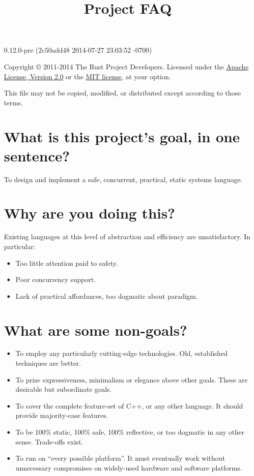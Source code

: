 \documentclass[]{article}
\title{Project FAQ}
\begin{document}
\maketitle

0.12.0-pre (2c50add48 2014-07-27 23:03:52 -0700)

Copyright © 2011-2014 The Rust Project Developers. Licensed under the
\href{http://www.apache.org/licenses/LICENSE-2.0}{Apache License,
Version 2.0} or the \href{http://opensource.org/licenses/MIT}{MIT
license}, at your option.

This file may not be copied, modified, or distributed except according
to those terms.

{
\hypersetup{linkcolor=black}
\setcounter{tocdepth}{3}
\tableofcontents
}
\section{What is this project's goal, in one
sentence?}\label{what-is-this-projects-goal-in-one-sentence}

To design and implement a safe, concurrent, practical, static systems
language.

\section{Why are you doing this?}\label{why-are-you-doing-this}

Existing languages at this level of abstraction and efficiency are
unsatisfactory. In particular:

\begin{itemize}
\itemsep1pt\parskip0pt
\item
  Too little attention paid to safety.
\item
  Poor concurrency support.
\item
  Lack of practical affordances, too dogmatic about paradigm.
\end{itemize}

\section{What are some non-goals?}\label{what-are-some-non-goals}

\begin{itemize}
\itemsep1pt\parskip0pt
\item
  To employ any particularly cutting-edge technologies. Old, established
  techniques are better.
\item
  To prize expressiveness, minimalism or elegance above other goals.
  These are desirable but subordinate goals.
\item
  To cover the complete feature-set of C++, or any other language. It
  should provide majority-case features.
\item
  To be 100\% static, 100\% safe, 100\% reflective, or too dogmatic in
  any other sense. Trade-offs exist.
\item
  To run on ``every possible platform''. It must eventually work without
  unnecessary compromises on widely-used hardware and software
  platforms.
\end{itemize}
\end{document}
